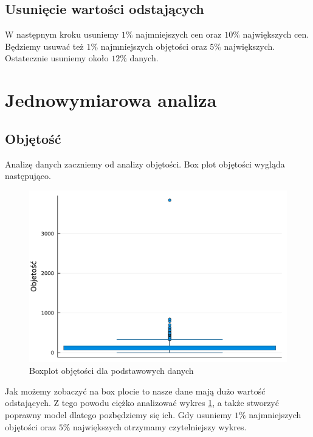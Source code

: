 \documentclass[12pt,leqno]{article}
\theoremstyle{exer}
\begin{document}
	\subsection{Usunięcie wartości odstających}
	W następnym kroku usuniemy $ 1 \% $ najmniejszych cen oraz  $ 10\%$ największych cen. Będziemy usuwać też  $ 1 \% $ najmniejszych objętości oraz  $ 5\%$ największych. Ostatecznie usuniemy około $12\%$ danych.
	
	\section{Jednowymiarowa analiza}
	\subsection{Objętość}
	Analizę danych zaczniemy od analizy objętości. Box plot objętości wygląda następująco.
	
	\begin{figure}[H]
		\centering
		\includegraphics[width=4\columnwidth/5]{images/boxplot_V_danych.pdf}
		\caption{Boxplot objętości dla podstawowych danych}
		\label{fig:box_V_orginal}
	\end{figure}
	
	Jak możemy zobaczyć na box plocie to nasze dane mają dużo wartość odstających. Z tego powodu ciężko analizować wykres \ref{fig:box_V_orginal}, a także stworzyć poprawny model dlatego pozbędziemy się ich. Gdy usuniemy $ 1 \% $ najmniejszych objętości oraz  $ 5\%$ największych otrzymamy czytelniejszy wykres.
	
\end{document}
